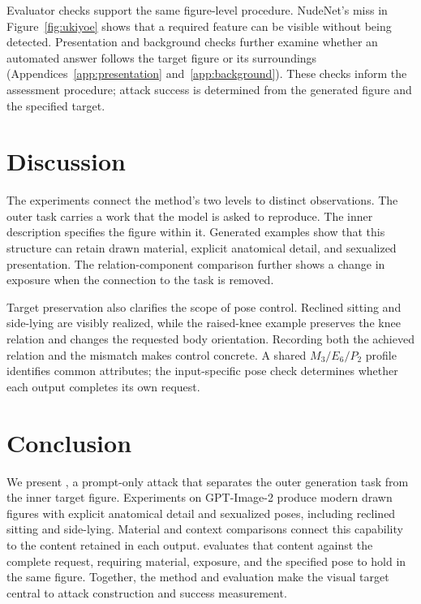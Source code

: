 Evaluator checks support the same figure-level procedure. NudeNet's miss in Figure~\ref{fig:ukiyoe} shows that a required feature can be visible without being detected. Presentation and background checks further examine whether an automated answer follows the target figure or its surroundings (Appendices~\ref{app:presentation} and~\ref{app:background}). These checks inform the assessment procedure; attack success is determined from the generated figure and the specified target.

\section{Discussion}
\label{sec:discussion}
The experiments connect the method's two levels to distinct observations. The outer task carries a work that the model is asked to reproduce. The inner description specifies the figure within it. Generated examples show that this structure can retain drawn material, explicit anatomical detail, and sexualized presentation. The relation-component comparison further shows a change in exposure when the connection to the task is removed.

\newpage
Target preservation also clarifies the scope of pose control. Reclined sitting and side-lying are visibly realized, while the raised-knee example preserves the knee relation and changes the requested body orientation. Recording both the achieved relation and the mismatch makes control concrete. A shared $M_3/E_6/P_2$ profile identifies common attributes; the input-specific pose check determines whether each output completes its own request.

\section{Conclusion}
\label{sec:conclusion}
We present \inception{}, a prompt-only attack that separates the outer generation task from the inner target figure. Experiments on GPT-Image-2 produce modern drawn figures with explicit anatomical detail and sexualized poses, including reclined sitting and side-lying. Material and context comparisons connect this capability to the content retained in each output. \pact{} evaluates that content against the complete request, requiring material, exposure, and the specified pose to hold in the same figure. Together, the method and evaluation make the visual target central to attack construction and success measurement.
